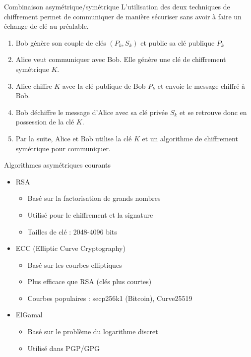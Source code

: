 \begin{frame}{Combinaison asymétrique/symétrique}
  L'utilisation des deux techniques de chiffrement permet de communiquer de manière sécuriser sans avoir à faire un échange de clé au préalable.

  \begin{enumerate}
    \item Bob génère son couple de clés $(P_k,S_k)$ et publie sa clé publique $P_k$
    \item Alice veut communiquer avec Bob. Elle génère une clé de chiffrement symétrique $K$.
    \item Alice chiffre $K$ avec la clé publique de Bob $P_k$ et envoie le message chiffré à Bob.
    \item Bob déchiffre le message d'Alice avec sa clé privée $S_k$ et se retrouve donc en possession de la clé $K$.
    \item Par la suite, Alice et Bob utilise la clé $K$ et un algorithme de chiffrement symétrique pour communiquer.
  \end{enumerate}
\end{frame}

\begin{frame}{Algorithmes asymétriques courants}
  \begin{itemize}
    \item RSA
      \begin{itemize}
        \item Basé sur la factorisation de grands nombres
        \item Utilisé pour le chiffrement et la signature
        \item Tailles de clé : 2048-4096 bits
      \end{itemize}
    \item ECC (Elliptic Curve Cryptography)
      \begin{itemize}
        \item Basé sur les courbes elliptiques
        \item Plus efficace que RSA (clés plus courtes)
        \item Courbes populaires : secp256k1 (Bitcoin), Curve25519
      \end{itemize}
    \item ElGamal
      \begin{itemize}
        \item Basé sur le problème du logarithme discret
        \item Utilisé dans PGP/GPG
      \end{itemize}
  \end{itemize}
\end{frame}

